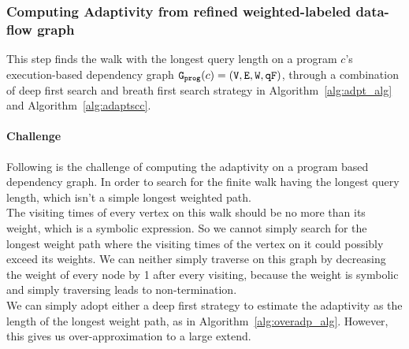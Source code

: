 


\clearpage
\subsubsection{Computing Adaptivity from refined weighted-labeled data-flow graph}
This step finds the walk with the longest query length on a program $c$'s execution-based dependency graph 
$\mathtt{{G_{prog}}}(c) = (\mathtt{V}, \mathtt{E}, \mathtt{W}, \mathtt{qF})$, through a combination of 
deep first search and breath first search strategy
in Algorithm~\ref{alg:adpt_alg} and Algorithm~\ref{alg:adaptscc}.

\paragraph*{Challenge}
Following is the challenge of computing the adaptivity on a program based dependency graph.
In order to search for the finite walk having the longest query length, which isn't a simple longest weighted path.
\\
The visiting times of every vertex on this walk should be no more than its weight, which is a symbolic expression.
So we cannot simply search for the longest weight path where the visiting times of the vertex on it could possibly exceed its weights.
We can neither simply traverse on this graph by decreasing the weight of every node by 1 after every visiting,
because the weight is symbolic and simply traversing leads to non-termination.
\\
We can simply adopt either a deep first strategy to estimate the adaptivity as the length of the longest weight path, as in Algorithm~\ref{alg:overadp_alg}.
However, this gives us over-approximation to a large extend.

